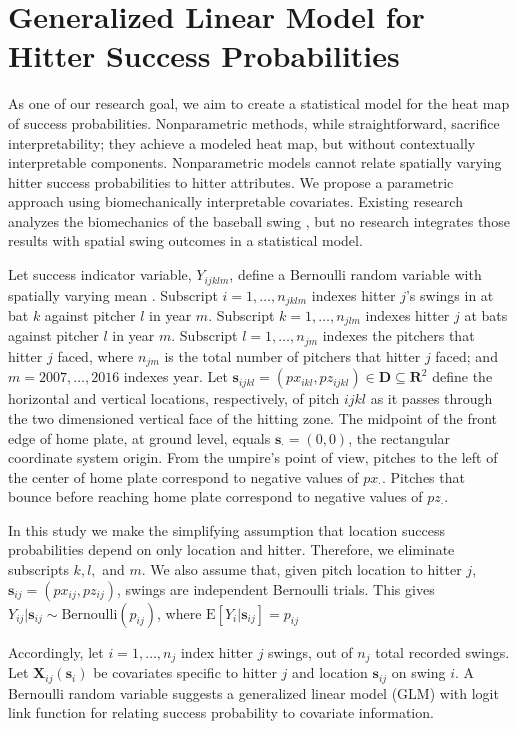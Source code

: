 \section{Generalized Linear Model for Hitter Success Probabilities} %

As one of our research goal, we aim to create a statistical model for the heat map of success probabilities. Nonparametric methods, while straightforward, sacrifice interpretability; they achieve a modeled heat map, but without contextually interpretable components. Nonparametric models cannot relate spatially varying hitter success probabilities to hitter attributes. We propose a parametric approach using biomechanically interpretable covariates. Existing research analyzes the biomechanics of the baseball swing \citep{Welch1995}, but no research integrates those results with spatial swing outcomes in a statistical model.

Let success indicator variable, $Y_{ijklm}$, define a Bernoulli random variable with spatially varying mean \citep{Ross2002}. Subscript $i = 1, \dots, n_{jklm}$ indexes hitter $j$'s swings in at bat $k$ against pitcher $l$ in year $m$. Subscript $k = 1, \dots, n_{jlm}$ indexes hitter $j$ at bats against pitcher $l$ in year $m$. Subscript $l = 1, \dots, n_{jm}$ indexes the pitchers that hitter $j$ faced, where $n_{jm}$ is the total number of pitchers that hitter $j$ faced; and $m = 2007, \dots, 2016$ indexes year. Let $\pmb{s}_{ijkl} = (px_{ikl}, pz_{ijkl})\in \pmb{D} \subseteq \pmb{R}^{2}$ define the horizontal and vertical locations, respectively, of pitch $ijkl$ as it passes through the two dimensioned vertical face of the hitting zone. The midpoint of the front edge of home plate, at ground level, equals $\pmb{s}_{\cdot} = (0,0)$, the rectangular coordinate system origin. From the umpire's point of view, pitches to the left of the center of home plate correspond to negative values of $px_{\cdot}$. Pitches that bounce before reaching home plate correspond to negative values of $pz_{\cdot}$.  

In this study we make the simplifying assumption that location success probabilities depend on only location and hitter. Therefore, we eliminate subscripts $k, l,$ and $m$. We also assume that, given pitch location to hitter $j$, $\pmb{s}_{ij} = (px_{ij}, pz_{ij})$,  swings are independent Bernoulli trials. This gives $Y_{ij}|\pmb{s}_{ij} \sim \text{Bernoulli}(p_{ij})$, where $\text{E}[Y_{i}|\pmb{s}_{ij}] = p_{ij}$

Accordingly, let $i = 1, \dots, n_{j}$ index hitter $j$ swings, out of $n_{j}$ total recorded swings. Let $\pmb{X}_{ij}(\pmb{s}_{i})$ be covariates specific to hitter $j$ and location $\pmb{s}_{ij}$ on swing $i$. A Bernoulli random variable suggests a generalized linear model (GLM) with logit link function for relating success probability to covariate information.

